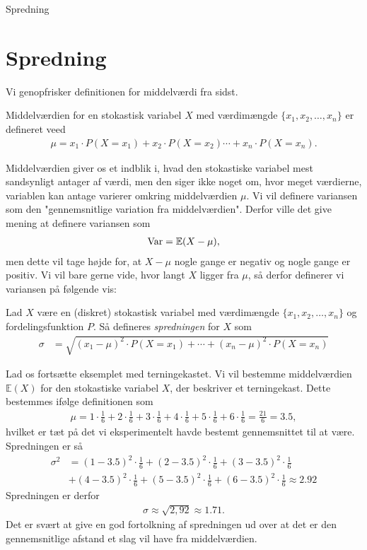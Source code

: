 
\begin{center}
\Huge
Spredning
\end{center}
\section*{Spredning}

Vi genopfrisker definitionen for middelværdi fra sidst.
\begin{defn}[Middelværdi]
	Middelværdien for en stokastisk variabel $X$ med værdimængde $\{x_1,x_2,\hdots, x_n\}$ er 
	defineret veed
	\begin{align*}
		\mu = x_1\cdot P(X = x_1) + x_2 \cdot P(X = x_2) \cdots + x_n \cdot P(X = x_n).
	\end{align*}
\end{defn}
Middelværdien giver os et indblik i, hvad den stokastiske variabel mest sandsynligt antager af værdi, men den siger ikke noget om, hvor meget værdierne, variablen kan antage varierer omkring middelværdien $\mu$. Vi vil definere variansen som den "gennemsnitlige variation fra middelværdien". Derfor ville det give mening at definere variansen som 
\begin{align*}
\textnormal{Var} = \mathbb{E}(X-\mu), 
\end{align*}
men dette vil tage højde for, at $X-\mu$ nogle gange er negativ og nogle gange er positiv. Vi vil bare gerne vide, hvor langt $X$ ligger fra $\mu$, så derfor definerer vi variansen på følgende vis:
\begin{defn}[spredning]
Lad $X$ være en (diskret) stokastisk variabel med værdimængde $\{x_1,x_2,\hdots,x_n\}$ og fordelingsfunktion $P$. Så defineres \textit{spredningen} for $X$ som
\begin{align*}
 \sigma &= \sqrt{(x_1-\mu)^2\cdot P(X=x_1) + \cdots + (x_n-\mu)^2 \cdot P(X=x_n)}
\end{align*}
\end{defn}

\begin{exa}
Lad os fortsætte eksemplet med terningekastet. Vi vil bestemme middelværdien $\mathbb{E}(X)$ for den stokastiske variabel $X$, der beskriver et terningekast. Dette bestemmes ifølge definitionen som
\begin{align*}
\mu = 1\cdot \frac{1}{6} + 2\cdot \frac{1}{6}+3\cdot \frac{1}{6}+4\cdot \frac{1}{6}+5\cdot \frac{1}{6}+6\cdot \frac{1}{6} = \frac{21}{6} = 3.5,
\end{align*}
hvilket er tæt på det vi eksperimentelt havde bestemt gennemsnittet til at være. 
Spredningen er så
\begin{align*}
\sigma^2 &= (1-3.5)^2 \cdot \frac{1}{6} + (2-3.5)^2 \cdot \frac{1}{6} + (3-3.5)^2 \cdot \frac{1}{6}\\
 &+ (4-3.5)^2 \cdot \frac{1}{6} + (5-3.5)^2 \cdot \frac{1}{6} +(6-3.5)^2 \cdot \frac{1}{6} \approx 2.92
\end{align*}
Spredningen er derfor 
\begin{align*}
\sigma \approx \sqrt{2,92} \approx 1.71.
\end{align*}
Det er svært at give en god fortolkning af spredningen ud over at det er den gennemsnitlige afstand et slag vil have fra middelværdien. 
\end{exa}

